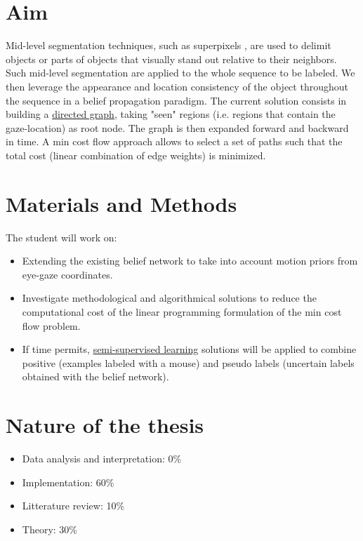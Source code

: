 \documentclass[11pt]{article}
\begin{document}
\section{Aim}
\label{sec:orgheadline2}
 Mid-level segmentation techniques, such as superpixels \cite{achanta2012,vandenbergh2014}, are used to delimit objects or parts of objects that visually stand out relative to their neighbors. Such mid-level segmentation are applied to the whole sequence to be labeled.
We then leverage the appearance and location consistency of the object throughout the sequence in a belief propagation paradigm. The current solution consists in building a \href{https://en.wikipedia.org/wiki/Directed_graph}{directed graph}, taking "seen" regions (i.e. regions that contain the gaze-location) as root node. The graph is then expanded forward and backward in time. A min cost flow approach allows to select a set of paths such that the total cost (linear combination of edge weights) is minimized.

\section{Materials and Methods}
\label{sec:orgheadline3}
The student will work on:
\begin{itemize}
\item Extending the existing belief network to take into account motion priors from eye-gaze coordinates.
\item Investigate methodological and algorithmical solutions to reduce the computational cost of the linear programming formulation of the min cost flow problem.
\item If time permits, \href{https://en.wikipedia.org/wiki/Semi-supervised_learning}{semi-supervised learning} solutions will be applied to combine positive (examples labeled with a mouse) and pseudo labels (uncertain labels obtained with the belief network).
\end{itemize}
\section{Nature of the thesis}
\label{sec:orgheadline4}
\begin{itemize}
\item Data analysis and interpretation: 0\%
\item Implementation: 60\%
\item Litterature review: 10\%
\item Theory: 30\%
\end{itemize}
\end{document}
